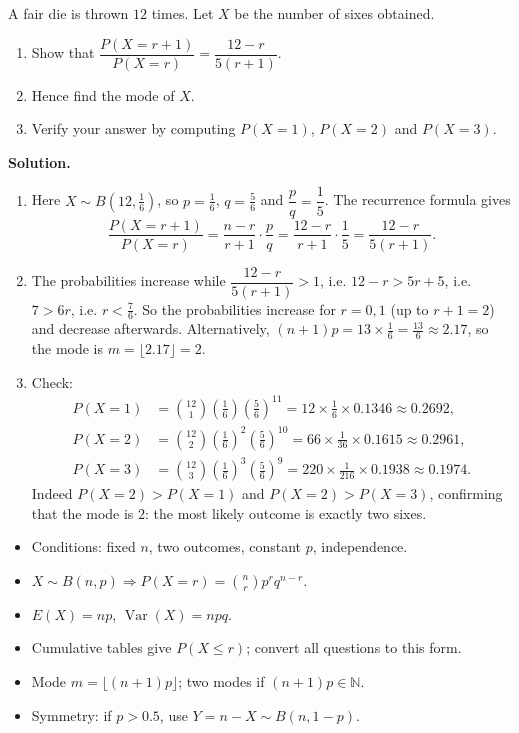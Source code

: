 \documentclass[11pt]{article}
\begin{document}
\begin{exoresolu}
A fair die is thrown $12$ times. Let $X$ be the number of sixes obtained.
\begin{enumerate}
\item Show that $\dfrac{P(X = r+1)}{P(X=r)} = \dfrac{12 - r}{5(r+1)}$.
\item Hence find the mode of $X$.
\item Verify your answer by computing $P(X=1)$, $P(X=2)$ and $P(X=3)$.
\end{enumerate}
\tcblower
\textbf{Solution.}
\begin{enumerate}
\item Here $X \sim B(12, \tfrac16)$, so $p = \tfrac16$, $q = \tfrac56$ and $\dfrac{p}{q} = \dfrac{1}{5}$. The recurrence formula gives
\[ \frac{P(X = r+1)}{P(X = r)} = \frac{n - r}{r+1}\cdot\frac{p}{q} = \frac{12 - r}{r+1}\cdot\frac{1}{5} = \frac{12 - r}{5(r+1)}. \]
\item The probabilities increase while $\dfrac{12 - r}{5(r+1)} > 1$, i.e. $12 - r > 5r + 5$, i.e. $7 > 6r$, i.e. $r < \tfrac76$. So the probabilities increase for $r = 0, 1$ (up to $r+1 = 2$) and decrease afterwards. Alternatively, $(n+1)p = 13 \times \tfrac16 = \tfrac{13}{6} \approx 2.17$, so the mode is $m = \lfloor 2.17 \rfloor = 2$.
\item Check:
\begin{align*}
P(X = 1) &= \binom{12}{1}\left(\tfrac16\right)\left(\tfrac56\right)^{11} = 12 \times \tfrac16 \times 0.1346 \approx 0.2692,\\
P(X = 2) &= \binom{12}{2}\left(\tfrac16\right)^{2}\left(\tfrac56\right)^{10} = 66 \times \tfrac{1}{36} \times 0.1615 \approx 0.2961,\\
P(X = 3) &= \binom{12}{3}\left(\tfrac16\right)^{3}\left(\tfrac56\right)^{9} = 220 \times \tfrac{1}{216} \times 0.1938 \approx 0.1974.
\end{align*}
Indeed $P(X=2) > P(X=1)$ and $P(X=2) > P(X=3)$, confirming that the mode is $\boxed{2}$: the most likely outcome is exactly two sixes.
\end{enumerate}
\end{exoresolu}

\begin{aretenir}
\begin{itemize}
\item Conditions: fixed $n$, two outcomes, constant $p$, independence.
\item $X \sim B(n,p) \Rightarrow P(X=r) = \binom{n}{r}p^r q^{n-r}$.
\item $E(X) = np$, $\operatorname{Var}(X) = npq$.
\item Cumulative tables give $P(X \leq r)$; convert all questions to this form.
\item Mode $m = \lfloor (n+1)p \rfloor$; two modes if $(n+1)p \in \mathbb{N}$.
\item Symmetry: if $p > 0.5$, use $Y = n-X \sim B(n, 1-p)$.
\end{itemize}
\end{aretenir}
\end{document}
